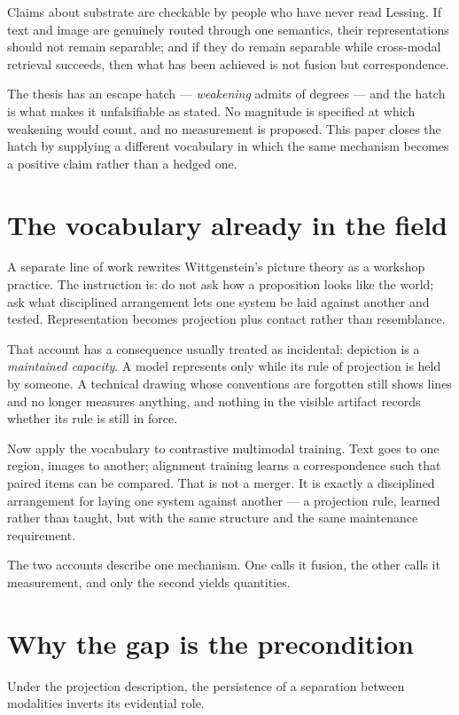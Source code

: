 \documentclass[11pt,a4paper]{article}
\begin{document}
Claims about substrate are checkable by people who have never read Lessing. If text and image are genuinely routed through one semantics, their representations should not remain separable; and if they do remain separable while cross-modal retrieval succeeds, then what has been achieved is not fusion but correspondence.

The thesis has an escape hatch --- \emph{weakening} admits of degrees --- and the hatch is what makes it unfalsifiable as stated. No magnitude is specified at which weakening would count, and no measurement is proposed. This paper closes the hatch by supplying a different vocabulary in which the same mechanism becomes a positive claim rather than a hedged one.

\section{The vocabulary already in the field}
A separate line of work rewrites Wittgenstein's picture theory as a workshop practice. The instruction is: do not ask how a proposition looks like the world; ask what disciplined arrangement lets one system be laid against another and tested. Representation becomes projection plus contact rather than resemblance.

That account has a consequence usually treated as incidental: depiction is a \emph{maintained capacity}. A model represents only while its rule of projection is held by someone. A technical drawing whose conventions are forgotten still shows lines and no longer measures anything, and nothing in the visible artifact records whether its rule is still in force.

Now apply the vocabulary to contrastive multimodal training. Text goes to one region, images to another; alignment training learns a correspondence such that paired items can be compared. That is not a merger. It is exactly a disciplined arrangement for laying one system against another --- a projection rule, learned rather than taught, but with the same structure and the same maintenance requirement.

The two accounts describe one mechanism. One calls it fusion, the other calls it measurement, and only the second yields quantities.

\section{Why the gap is the precondition}
Under the projection description, the persistence of a separation between modalities inverts its evidential role.
\end{document}
